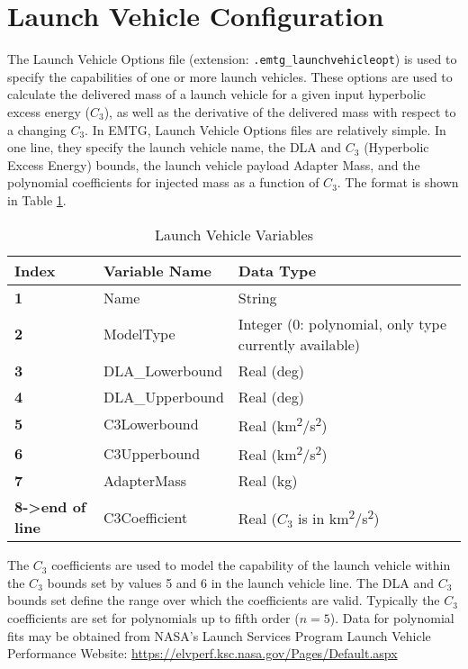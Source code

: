 \section{Launch Vehicle Configuration}

\label{sec:lv_config}
The Launch Vehicle Options file (extension: {\tt .emtg\_launchvehicleopt}) is used to specify the capabilities of one or more launch vehicles.
These options are used to calculate the delivered mass of a launch vehicle for a given input hyperbolic excess energy ($C_3$), as well as the derivative of the delivered mass with respect to a changing $C_3$.
In \ac{EMTG}, Launch Vehicle Options files are relatively simple. 
In one line, they specify the launch vehicle name, the \acf{DLA} and $C_3$ (Hyperbolic Excess Energy) bounds, the launch vehicle payload Adapter Mass, and the polynomial coefficients for injected mass as a function of $C_3$. The format is shown in Table \ref{tab:launchvehicleopt}.

\begin{table}[ht]
    \centering
    \begin{tabular}{lll}
    \hline
    \textbf{Index} & \textbf{Variable Name} & \textbf{Data Type} \\
    \hline
    \textbf{1} & Name & String \\
    \textbf{2} & ModelType & Integer (0: polynomial, only type currently available) \\
    \textbf{3} & \ac{DLA}\_Lowerbound & Real (deg) \\
    \textbf{4} & \ac{DLA}\_Upperbound & Real (deg) \\
    \textbf{5} & C3Lowerbound & Real (km\textsuperscript{2}/s\textsuperscript{2}) \\
    \textbf{6} & C3Upperbound & Real (km\textsuperscript{2}/s\textsuperscript{2}) \\
    \textbf{7} & AdapterMass & Real (kg) \\
    \textbf{8->end of line} & C3Coefficient & Real ($C_3$ is in km\textsuperscript{2}/s\textsuperscript{2}) \\
    \end{tabular}
    \caption{Launch Vehicle Variables}
    \label{tab:launchvehicleopt}
\end{table}

\noindent The $C_3$ coefficients are used to model the capability of the launch vehicle within the $C_3$ bounds set by values 5 and 6 in the launch vehicle line.
The \ac{DLA} and $C_3$ bounds set define the range over which the coefficients are valid.
Typically the $C_3$ coefficients are set for polynomials up to fifth order ($n=5$).
Data for polynomial fits may be obtained from NASA's Launch Services Program Launch Vehicle Performance Website: \href{https://elvperf.ksc.nasa.gov/Pages/Default.aspx}{https://elvperf.ksc.nasa.gov/Pages/Default.aspx}

